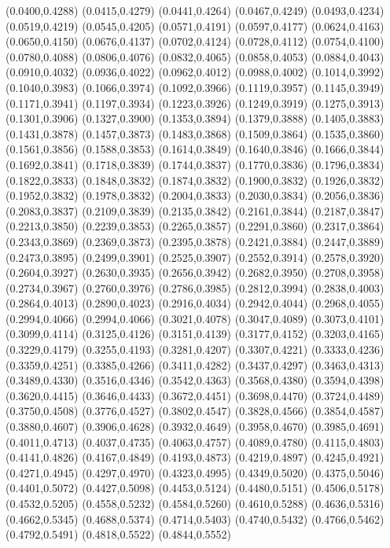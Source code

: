 \PST@ThickBorder(0.0400,0.4288)
(0.0415,0.4279)
(0.0441,0.4264)
(0.0467,0.4249)
(0.0493,0.4234)
(0.0519,0.4219)
(0.0545,0.4205)
(0.0571,0.4191)
(0.0597,0.4177)
(0.0624,0.4163)
(0.0650,0.4150)
(0.0676,0.4137)
(0.0702,0.4124)
(0.0728,0.4112)
(0.0754,0.4100)
(0.0780,0.4088)
(0.0806,0.4076)
(0.0832,0.4065)
(0.0858,0.4053)
(0.0884,0.4043)
(0.0910,0.4032)
(0.0936,0.4022)
(0.0962,0.4012)
(0.0988,0.4002)
(0.1014,0.3992)
(0.1040,0.3983)
(0.1066,0.3974)
(0.1092,0.3966)
(0.1119,0.3957)
(0.1145,0.3949)
(0.1171,0.3941)
(0.1197,0.3934)
(0.1223,0.3926)
(0.1249,0.3919)
(0.1275,0.3913)
(0.1301,0.3906)
(0.1327,0.3900)
(0.1353,0.3894)
(0.1379,0.3888)
(0.1405,0.3883)
(0.1431,0.3878)
(0.1457,0.3873)
(0.1483,0.3868)
(0.1509,0.3864)
(0.1535,0.3860)
(0.1561,0.3856)
(0.1588,0.3853)
(0.1614,0.3849)
(0.1640,0.3846)
(0.1666,0.3844)
(0.1692,0.3841)
(0.1718,0.3839)
(0.1744,0.3837)
(0.1770,0.3836)
(0.1796,0.3834)
(0.1822,0.3833)
(0.1848,0.3832)
(0.1874,0.3832)
(0.1900,0.3832)
(0.1926,0.3832)
(0.1952,0.3832)
(0.1978,0.3832)
(0.2004,0.3833)
(0.2030,0.3834)
(0.2056,0.3836)
(0.2083,0.3837)
(0.2109,0.3839)
(0.2135,0.3842)
(0.2161,0.3844)
(0.2187,0.3847)
(0.2213,0.3850)
(0.2239,0.3853)
(0.2265,0.3857)
(0.2291,0.3860)
(0.2317,0.3864)
(0.2343,0.3869)
(0.2369,0.3873)
(0.2395,0.3878)
(0.2421,0.3884)
(0.2447,0.3889)
(0.2473,0.3895)
(0.2499,0.3901)
(0.2525,0.3907)
(0.2552,0.3914)
(0.2578,0.3920)
(0.2604,0.3927)
(0.2630,0.3935)
(0.2656,0.3942)
(0.2682,0.3950)
(0.2708,0.3958)
(0.2734,0.3967)
(0.2760,0.3976)
(0.2786,0.3985)
(0.2812,0.3994)
(0.2838,0.4003)
(0.2864,0.4013)
(0.2890,0.4023)
(0.2916,0.4034)
(0.2942,0.4044)
(0.2968,0.4055)
(0.2994,0.4066)
\PST@ThickBorder(0.2994,0.4066)
(0.3021,0.4078)
(0.3047,0.4089)
(0.3073,0.4101)
(0.3099,0.4114)
(0.3125,0.4126)
(0.3151,0.4139)
(0.3177,0.4152)
(0.3203,0.4165)
(0.3229,0.4179)
(0.3255,0.4193)
(0.3281,0.4207)
(0.3307,0.4221)
(0.3333,0.4236)
(0.3359,0.4251)
(0.3385,0.4266)
(0.3411,0.4282)
(0.3437,0.4297)
(0.3463,0.4313)
(0.3489,0.4330)
(0.3516,0.4346)
(0.3542,0.4363)
(0.3568,0.4380)
(0.3594,0.4398)
(0.3620,0.4415)
(0.3646,0.4433)
(0.3672,0.4451)
(0.3698,0.4470)
(0.3724,0.4489)
(0.3750,0.4508)
(0.3776,0.4527)
(0.3802,0.4547)
(0.3828,0.4566)
(0.3854,0.4587)
(0.3880,0.4607)
(0.3906,0.4628)
(0.3932,0.4649)
(0.3958,0.4670)
(0.3985,0.4691)
(0.4011,0.4713)
(0.4037,0.4735)
(0.4063,0.4757)
(0.4089,0.4780)
(0.4115,0.4803)
(0.4141,0.4826)
(0.4167,0.4849)
(0.4193,0.4873)
(0.4219,0.4897)
(0.4245,0.4921)
(0.4271,0.4945)
(0.4297,0.4970)
(0.4323,0.4995)
(0.4349,0.5020)
(0.4375,0.5046)
(0.4401,0.5072)
(0.4427,0.5098)
(0.4453,0.5124)
(0.4480,0.5151)
(0.4506,0.5178)
(0.4532,0.5205)
(0.4558,0.5232)
(0.4584,0.5260)
(0.4610,0.5288)
(0.4636,0.5316)
(0.4662,0.5345)
(0.4688,0.5374)
(0.4714,0.5403)
(0.4740,0.5432)
(0.4766,0.5462)
(0.4792,0.5491)
(0.4818,0.5522)
(0.4844,0.5552)

